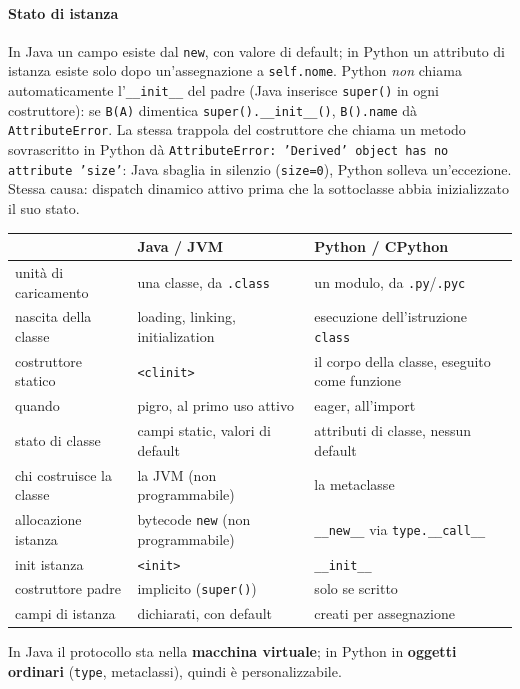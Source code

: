 \documentclass[a4paper,12pt]{article}
\begin{document}
\paragraph{Stato di istanza} In Java un campo esiste dal \texttt{new}, con valore di default; in
Python un attributo di istanza esiste solo dopo un'assegnazione a \texttt{self.nome}. Python
\emph{non} chiama automaticamente l'\texttt{\_\_init\_\_} del padre (Java inserisce
\texttt{super()} in ogni costruttore): se \texttt{B(A)} dimentica \texttt{super().\_\_init\_\_()},
\texttt{B().name} dà \texttt{AttributeError}. La stessa trappola del costruttore che chiama un
metodo sovrascritto in Python dà \texttt{AttributeError: 'Derived' object has no attribute
'size'}: Java sbaglia in silenzio (\texttt{size=0}), Python solleva un'eccezione. Stessa causa:
dispatch dinamico attivo prima che la sottoclasse abbia inizializzato il suo stato.
\begin{center}
\small
\begin{tabular}{|l|p{5.5cm}|p{5.5cm}|}
\hline
 & \textbf{Java / JVM} & \textbf{Python / CPython} \\
\hline
unità di caricamento & una classe, da \texttt{.class} & un modulo, da \texttt{.py}/\texttt{.pyc} \\
nascita della classe & loading, linking, initialization & esecuzione dell'istruzione \texttt{class} \\
costruttore statico & \texttt{<clinit>} & il corpo della classe, eseguito come funzione \\
quando & pigro, al primo uso attivo & eager, all'import \\
stato di classe & campi static, valori di default & attributi di classe, nessun default \\
chi costruisce la classe & la JVM (non programmabile) & la metaclasse \\
allocazione istanza & bytecode \texttt{new} (non programmabile) & \texttt{\_\_new\_\_} via \texttt{type.\_\_call\_\_} \\
init istanza & \texttt{<init>} & \texttt{\_\_init\_\_} \\
costruttore padre & implicito (\texttt{super()}) & solo se scritto \\
campi di istanza & dichiarati, con default & creati per assegnazione \\
\hline
\end{tabular}
\end{center}
In Java il protocollo sta nella \textbf{macchina virtuale}; in Python in \textbf{oggetti
ordinari} (\texttt{type}, metaclassi), quindi è personalizzabile.
\end{document}
